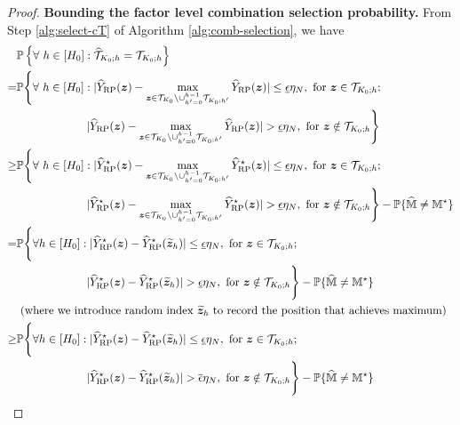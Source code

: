 \documentclass[12pt]{article}
\begin{document}
\begin{proof}
    \textbf{Bounding the factor level combination selection probability.} From Step \ref{alg:select-cT} of Algorithm \ref{alg:comb-selection}, we have
    \begingroup
    \allowdisplaybreaks
    \begin{align*}
        &\bbP\lt\{\forall~h \in [H_0]: \hat{\cT}_{K_0;h} = {\cT}_{K_0;h} \rt\} \\
        = & \bbP\Bigg\{\forall ~ h \in [H_0]:   |\hY_{\operatorname{RP}}(\bz)-\max_{\bz\in\cT_{K_0}\backslash\cup_{h'=0}^{h-1} {\cT}_{K_0;h'}}\hY_{\operatorname{RP}}(\bz)| \le \underline{\epsilon}\eta_N ,  \text{ for }\bz\in\cT_{K_0;h} ; \\
        &\phantom{ \bbP\Bigg\{\forall h \in [H_0]: } |\hY_{\operatorname{RP}}(\bz)-\max_{\bz\in\cT_{K_0}\backslash\cup_{h'=0}^{h-1} {\cT}_{K_0;h'}}\hY_{\operatorname{RP}}(\bz)| > \underline{\epsilon}\eta_N ,  \text{ for }\bz\notin\cT_{K_0;h}\Bigg\} \\
        \ge & \bbP\Bigg\{\forall ~ h \in [H_0]:   |\hY^\star_{\operatorname{RP}}(\bz)-\max_{\bz\in\cT_{K_0}\backslash\cup_{h'=0}^{h-1} {\cT}_{K_0;h'}}\hY^\star_{\operatorname{RP}}(\bz)| \le \underline{\epsilon}\eta_N ,  \text{ for }\bz\in\cT_{K_0;h} ; \\
        &\phantom{ \bbP\Bigg\{\forall h \in [H_0]: } |\hY^\star_{\operatorname{RP}}(\bz)-\max_{\bz\in\cT_{K_0}\backslash\cup_{h'=0}^{h-1} {\cT}_{K_0;h'}}\hY^\star_{\operatorname{RP}}(\bz)| > \underline{\epsilon}\eta_N ,  \text{ for }\bz\notin\cT_{K_0;h}\Bigg\} - \bbP\{\hat{\bbM}\neq \bbM^\star\}\\
        = & \bbP\Bigg\{\forall h \in [H_0]:   |\hY^\star_{\operatorname{RP}}(\bz)-\hY^\star_{\operatorname{RP}}(\tilde{\bz}_h)| \le \underline{\epsilon}\eta_N ,  \text{ for }\bz\in\cT_{K_0;h} ; \\
        &\phantom{ \bbP\Bigg\{\forall h \in [H_0]: } |\hY^\star_{\operatorname{RP}}(\bz)-\hY^\star_{\operatorname{RP}}(\tilde{\bz}_h)| > \underline{\epsilon}\eta_N ,  \text{ for }\bz\notin\cT_{K_0;h}\Bigg\}  - \bbP\{\hat{\bbM}\neq \bbM^\star\}\\
        &\see{where we introduce random index $\tilde{\bz}_h$ to record the position that achieves maximum} \\
       \ge & \bbP\Bigg\{\forall h \in [H_0]:   |\hY^\star_{\operatorname{RP}}(\bz)-\hY^\star_{\operatorname{RP}}(\tilde{\bz}_h)| \le \underline{\epsilon}\eta_N ,  \text{ for }\bz\in\cT_{K_0;h} ; \\
        &\phantom{ \bbP\Bigg\{\forall h \in [H_0]: } |\hY^\star_{\operatorname{RP}}(\bz)-\hY^\star_{\operatorname{RP}}(\tilde{\bz}_h)| > \overline{\epsilon}\eta_N ,  \text{ for }\bz\notin\cT_{K_0;h}\Bigg\}  - \bbP\{\hat{\bbM}\neq \bbM^\star\}\\

\end{align*}
\end{proof}
\end{document}
